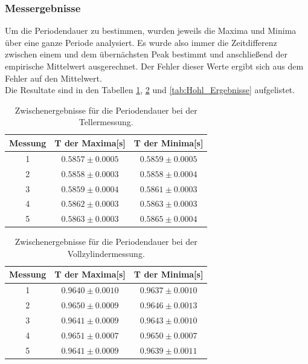 \documentclass[12pt,a4paper]{article}
\begin{document}
\subsubsection{Messergebnisse}
Um die Periodendauer zu bestimmen, wurden jeweils die Maxima und Minima über eine ganze Periode analysiert. Es wurde also immer die Zeitdifferenz zwischen einem und dem übernächsten Peak bestimmt und anschließend der empirische Mittelwert ausgerechnet. Der Fehler dieser Werte ergibt sich aus dem Fehler auf den Mittelwert.\\
Die Resultate sind in den Tabellen \ref{tab:Teller_Ergebnisse}, \ref{tab:Voll_Ergebnisse} und \ref{tab:Hohl_Ergebnisse} aufgelistet.
\begin{table}[H]
\caption{Zwischenergebnisse für die Periodendauer bei der Tellermessung.}
\begin{center}
\begin{tabular}{|c|c|c|}
\hline
Messung & T der Maxima[s] & T der Minima[s]  \\
\hline
1  & $ 0.5857 \pm  0.0005 $ & $ 0.5859 \pm  0.0005 $ \\
\hline
2  & $ 0.5858 \pm  0.0003 $ & $ 0.5858 \pm  0.0004 $ \\
\hline
3  & $ 0.5859 \pm  0.0004 $ & $ 0.5861 \pm  0.0003 $ \\
\hline
4  & $ 0.5862 \pm  0.0003 $ & $ 0.5863 \pm  0.0003 $ \\
\hline
5  & $ 0.5863 \pm  0.0003 $ & $ 0.5865 \pm  0.0004 $ \\
\hline
\end{tabular}
\end{center}
\label{tab:Teller_Ergebnisse}
\end{table}

\begin{table}[H]
\caption{Zwischenergebnisse für die Periodendauer bei der Vollzylindermessung.}
\begin{center}
\begin{tabular}{|c|c|c|}
\hline
Messung &  T der Maxima[s] &  T der Minima[s]  \\
\hline
1  & $ 0.9640 \pm  0.0010 $ & $ 0.9637 \pm  0.0010 $ \\
\hline
2  & $ 0.9650 \pm  0.0009 $ & $ 0.9646 \pm  0.0013 $ \\
\hline
3  & $ 0.9641 \pm  0.0009 $ & $ 0.9643 \pm  0.0010 $ \\
\hline
4  & $ 0.9651 \pm  0.0007 $ & $ 0.9650 \pm  0.0007 $ \\
\hline
5  & $ 0.9641 \pm  0.0009 $ & $ 0.9639 \pm  0.0011 $ \\
\hline
\end{tabular}
\end{center}
\label{tab:Voll_Ergebnisse}
\end{table}
\end{document}
